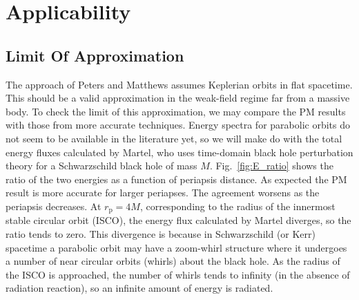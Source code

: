 \documentclass[aps,prd,reprint,showpacs,groupedaddress]{revtex4-1}
\newcommand{\Figref}[1]{Fig.~\ref{fig:#1}}
\newcommand{\sub}[1]{\ensuremath{_\text{#1}}}
\begin{document}
\section{Applicability\label{sec:application}}

\subsection{Limit Of Approximation}

The approach of Peters and Matthews assumes Keplerian orbits in flat spacetime. This should be a valid approximation in the weak-field regime far from a massive body. To check the limit of this approximation, we may compare the PM results with those from more accurate techniques. Energy spectra for parabolic orbits do not seem to be available in the literature yet, so we will make do with the total energy fluxes calculated by Martel\cite{Martel2004a}, who uses time-domain black hole perturbation theory for a Schwarzschild black hole of mass $M$. \Figref{E_ratio} shows the ratio of the two energies as a function of periapsis distance. As expected the PM result is more accurate for larger periapses. The agreement worsens as the periapsis decreases. At $r\sub{p} = 4 M$, corresponding to the radius of the innermost stable circular orbit (ISCO), the energy flux calculated by Martel diverges, so the ratio tends to zero. This divergence is because in Schwarzschild (or Kerr) spacetime a parabolic orbit may have a zoom-whirl structure where it undergoes a number of near circular orbits (whirls) about the black hole. As the radius of the ISCO is approached, the number of whirls tends to infinity (in the absence of radiation reaction), so an infinite amount of energy is radiated.
\end{document}
